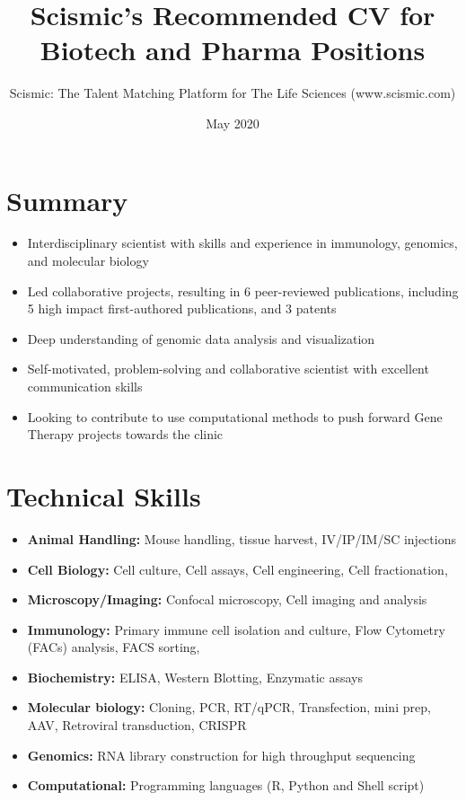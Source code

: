 \documentclass{article}
\title{Scismic's Recommended CV for Biotech and Pharma Positions}
\author{Scismic: The Talent Matching Platform for The Life Sciences (www.scismic.com)}
\date{May 2020}
\begin{document}

\makecvtitle %

\section{Summary}
\begin{itemize}
\item Interdisciplinary scientist with skills and experience in immunology, genomics, and molecular biology
\item Led collaborative projects, resulting in 6 peer-reviewed publications, including 5 high impact first-authored publications, and 3 patents
\item Deep understanding of genomic data analysis and visualization
\item Self-motivated, problem-solving and collaborative scientist with excellent communication skills
\item Looking to contribute to use computational methods to push forward Gene Therapy projects towards the clinic
\end{itemize}

\section{Technical Skills}

\begin{itemize}
\item \textbf{Animal Handling:} Mouse handling, tissue harvest, IV/IP/IM/SC injections
\item \textbf{Cell Biology:} Cell culture, Cell assays, Cell engineering, Cell fractionation,
\item \textbf{Microscopy/Imaging:} Confocal microscopy, Cell imaging and analysis
\item \textbf{Immunology:} Primary immune cell isolation and culture, Flow Cytometry (FACs) analysis, FACS sorting,
\item \textbf{Biochemistry:} ELISA, Western Blotting, Enzymatic assays
\item \textbf{Molecular biology:} Cloning, PCR, RT/qPCR, Transfection, mini prep, AAV, Retroviral transduction, CRISPR
\item \textbf{Genomics:} RNA library construction for high throughput sequencing
\item \textbf{Computational:} Programming languages (R, Python and Shell script)
\end{itemize}
\end{document}
